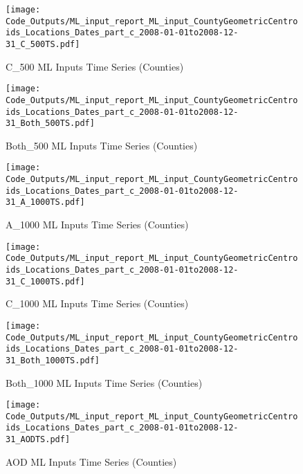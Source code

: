 \begin{figure} 
\centering  
\texttt{[image: Code\_Outputs/ML\_input\_report\_ML\_input\_CountyGeometricCentroids\_Locations\_Dates\_part\_c\_2008-01-01to2008-12-31\_C\_500TS.pdf]} 
\caption{\label{fig:ML_input_report_ML_input_CountyGeometricCentroids_Locations_Dates_part_c_2008-01-01to2008-12-31C_500TS}C_500 ML Inputs Time Series (Counties)} 
\end{figure} 
 

\begin{figure} 
\centering  
\texttt{[image: Code\_Outputs/ML\_input\_report\_ML\_input\_CountyGeometricCentroids\_Locations\_Dates\_part\_c\_2008-01-01to2008-12-31\_Both\_500TS.pdf]} 
\caption{\label{fig:ML_input_report_ML_input_CountyGeometricCentroids_Locations_Dates_part_c_2008-01-01to2008-12-31Both_500TS}Both_500 ML Inputs Time Series (Counties)} 
\end{figure} 
 

\begin{figure} 
\centering  
\texttt{[image: Code\_Outputs/ML\_input\_report\_ML\_input\_CountyGeometricCentroids\_Locations\_Dates\_part\_c\_2008-01-01to2008-12-31\_A\_1000TS.pdf]} 
\caption{\label{fig:ML_input_report_ML_input_CountyGeometricCentroids_Locations_Dates_part_c_2008-01-01to2008-12-31A_1000TS}A_1000 ML Inputs Time Series (Counties)} 
\end{figure} 
 

\begin{figure} 
\centering  
\texttt{[image: Code\_Outputs/ML\_input\_report\_ML\_input\_CountyGeometricCentroids\_Locations\_Dates\_part\_c\_2008-01-01to2008-12-31\_C\_1000TS.pdf]} 
\caption{\label{fig:ML_input_report_ML_input_CountyGeometricCentroids_Locations_Dates_part_c_2008-01-01to2008-12-31C_1000TS}C_1000 ML Inputs Time Series (Counties)} 
\end{figure} 
 

\begin{figure} 
\centering  
\texttt{[image: Code\_Outputs/ML\_input\_report\_ML\_input\_CountyGeometricCentroids\_Locations\_Dates\_part\_c\_2008-01-01to2008-12-31\_Both\_1000TS.pdf]} 
\caption{\label{fig:ML_input_report_ML_input_CountyGeometricCentroids_Locations_Dates_part_c_2008-01-01to2008-12-31Both_1000TS}Both_1000 ML Inputs Time Series (Counties)} 
\end{figure} 
 

\begin{figure} 
\centering  
\texttt{[image: Code\_Outputs/ML\_input\_report\_ML\_input\_CountyGeometricCentroids\_Locations\_Dates\_part\_c\_2008-01-01to2008-12-31\_AODTS.pdf]} 
\caption{\label{fig:ML_input_report_ML_input_CountyGeometricCentroids_Locations_Dates_part_c_2008-01-01to2008-12-31AODTS}AOD ML Inputs Time Series (Counties)} 
\end{figure} 
 

